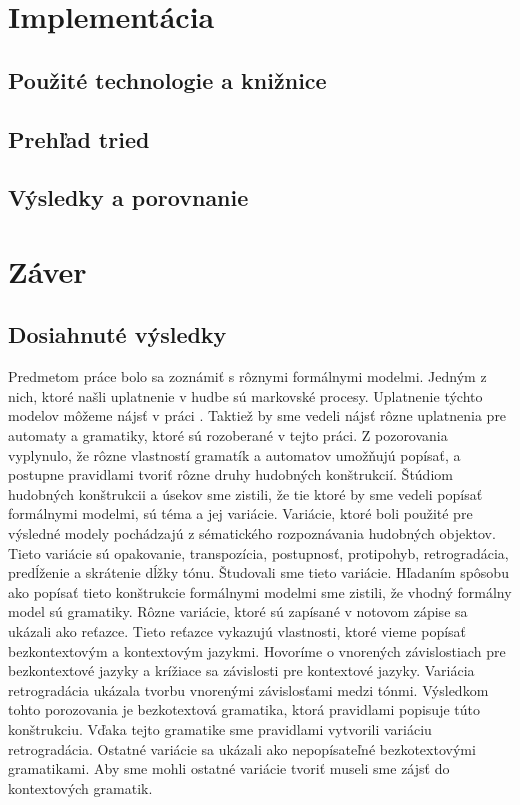 \chapter{Implementácia}
\label{chap:imp}

\section{Použité technologie a knižnice}
\section{Prehľad tried}
\section{Výsledky a porovnanie}
\chapter{Záver}
\label{chap:end}
\section{Dosiahnuté výsledky}
Predmetom práce bolo sa zoznámiť s rôznymi formálnymi modelmi. Jedným z nich, ktoré našli uplatnenie v hudbe sú markovské procesy. Uplatnenie týchto modelov môžeme nájsť v práci \cite{afrpub}. Taktiež by sme vedeli nájsť rôzne uplatnenia pre automaty a gramatiky, ktoré sú rozoberané v tejto práci. Z pozorovania vyplynulo, že rôzne vlastností gramatík a automatov umožňujú popísať, a postupne pravidlami tvoriť rôzne druhy hudobných konštrukcií. 
Štúdiom hudobných konštrukcii a úsekov sme zistili, že tie ktoré by sme vedeli popísať formálnymi modelmi, sú téma a jej variácie. Variácie, ktoré boli použité pre výsledné modely pochádzajú z sématického rozpoznávania hudobných objektov. Tieto variácie sú opakovanie, transpozícia, postupnosť, protipohyb, retrogradácia, predĺženie a skrátenie dĺžky tónu. Študovali sme tieto variácie. Hľadaním spôsobu ako popísať tieto konštrukcie formálnymi modelmi sme zistili, že vhodný formálny model sú gramatiky. Rôzne variácie, ktoré sú zapísané v notovom zápise sa ukázali ako reťazce. Tieto reťazce vykazujú vlastnosti, ktoré vieme popísať bezkontextovým a kontextovým jazykmi. Hovoríme o vnorených závislostiach pre bezkontextové jazyky a krížiace sa závislosti pre kontextové jazyky. Variácia retrogradácia ukázala tvorbu vnorenými závislosťami medzi tónmi. Výsledkom tohto porozovania je bezkotextová gramatika, ktorá pravidlami popisuje túto konštrukciu. Vďaka tejto gramatike sme pravidlami vytvorili variáciu retrogradácia. Ostatné variácie sa ukázali ako nepopísateľné bezkotextovými gramatikami. Aby sme mohli ostatné variácie tvoriť museli sme zájsť do kontextových gramatik.

